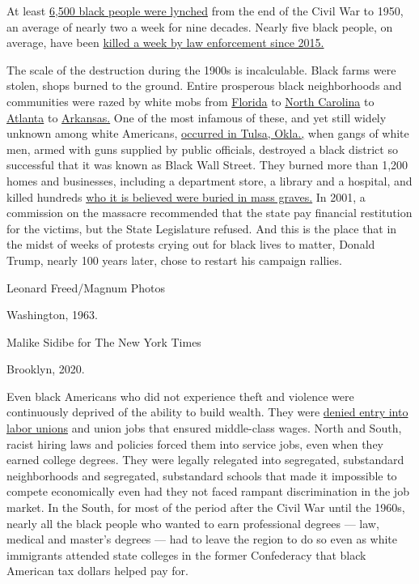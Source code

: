 At least \href{https://lynchinginamerica.eji.org/report/}{6,500 black
people were lynched} from the end of the Civil War to 1950, an average
of nearly two a week for nine decades. Nearly five black people, on
average, have been
\href{https://www.washingtonpost.com/graphics/investigations/police-shootings-database/?itid=lk_inline_manual_5}{killed
a week by law enforcement since 2015.}

The scale of the destruction during the 1900s is incalculable. Black
farms were stolen, shops burned to the ground. Entire prosperous black
neighborhoods and communities were razed by white mobs from
\href{https://www.ajc.com/news/national/the-rosewood-massacre-how-lie-destroyed-black-town/wTcKjELkGskePsWiwutQuO/}{Florida}
to \href{https://www.ncpedia.org/wilmington-race-riot}{North Carolina}
to
\href{https://www.georgiaencyclopedia.org/articles/history-archaeology/atlanta-race-riot-1906}{Atlanta}
to
\href{https://www.nytimes3xbfgragh.onion/2019/09/30/opinion/elaine-massacre-1919-arkansas.html}{Arkansas.}
One of the most infamous of these, and yet still widely unknown among
white Americans,
\href{https://www.tulsahistory.org/exhibit/1921-tulsa-race-massacre/}{occurred
in Tulsa, Okla.,} when gangs of white men, armed with guns supplied by
public officials, destroyed a black district so successful that it was
known as Black Wall Street. They burned more than 1,200 homes and
businesses, including a department store, a library and a hospital, and
killed hundreds
\href{https://www.nytimes3xbfgragh.onion/2020/06/19/opinion/tulsa-race-riot-massacre-graves.html}{who
it is believed were buried in mass graves.} In 2001, a commission on the
massacre recommended that the state pay financial restitution for the
victims, but the State Legislature refused. And this is the place that
in the midst of weeks of protests crying out for black lives to matter,
Donald Trump, nearly 100 years later, chose to restart his campaign
rallies.

Leonard Freed/Magnum Photos

Washington, 1963.

Malike Sidibe for The New York Times

Brooklyn, 2020.

Even black Americans who did not experience theft and violence were
continuously deprived of the ability to build wealth. They were
\href{https://www.lib.umd.edu/unions/social/african-americans-rights}{denied
entry into labor unions} and union jobs that ensured middle-class wages.
North and South, racist hiring laws and policies forced them into
service jobs, even when they earned college degrees. They were legally
relegated into segregated, substandard neighborhoods and segregated,
substandard schools that made it impossible to compete economically even
had they not faced rampant discrimination in the job market. In the
South, for most of the period after the Civil War until the 1960s,
nearly all the black people who wanted to earn professional degrees ---
law, medical and master's degrees --- had to leave the region to do so
even as white immigrants attended state colleges in the former
Confederacy that black American tax dollars helped pay for.

